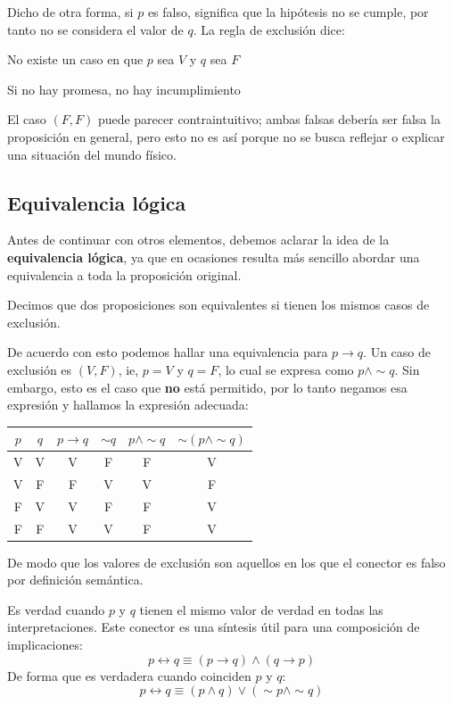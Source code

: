 \documentclass{book}
\begin{document}
  Dicho de otra forma, si $p$ es falso, significa que la hipótesis no se cumple,
  por tanto no se considera el valor de $q$. La regla de exclusión dice:
  
  \alert{No existe un caso en que $p$ sea $V$ y $q$ sea $F$}
  
  \alert{Si no hay promesa, no hay incumplimiento}
  
  El caso $(F, F)$ puede parecer contraintuitivo; ambas falsas debería ser falsa la proposición
  en general, pero esto no es así porque no se busca reflejar o explicar una situación del mundo físico.
  
  \subsection{Equivalencia lógica}
  
  Antes de continuar con otros elementos, debemos aclarar la idea de la \textbf{equivalencia
  lógica}, ya que en ocasiones resulta más sencillo abordar una equivalencia a toda la
  proposición original.
  
  \begin{definition}[title=Equivalencia]
  Decimos que dos proposiciones son equivalentes si tienen los mismos casos de exclusión.
  \end{definition}
  
  De acuerdo con esto podemos hallar una equivalencia para $p \to q$. Un caso de exclusión
  es $(V, F)$, ie, $p = V$ y $q = F$, lo cual se expresa como $p \land \sim q$. Sin embargo,
  esto es el caso que \textbf{no} está permitido, por lo tanto negamos esa expresión y
  hallamos la expresión adecuada:
  
  \begin{tabular}{c|c|c|c|c|c}
  $p$ & $q$ & $p \to q$ & $\sim q$ & $p \land \sim q$ & $\sim(p \land \sim q)$ \\
  \hline
  V & V & V & F & F & V \\
  V & F & F & V & V & F \\
  F & V & V & F & F & V \\
  F & F & V & V & F & V \\
  \end{tabular}
  
  \alert{De modo que los valores de exclusión son aquellos en los que el conector es falso
  por definición semántica.}
  
  \begin{definition}[title=Bicondicional]
  Es verdad cuando $p$ y $q$ tienen el mismo valor de verdad en todas las interpretaciones.
  Este conector es una síntesis útil para una composición de implicaciones:
  \begin{equation}
  p \leftrightarrow q \equiv (p \to q) \land (q \to p)
  \end{equation}
  De forma que es verdadera cuando coinciden $p$ y $q$:
  \begin{equation}
  p \leftrightarrow q \equiv (p \land q) \lor (\sim p \land \sim q)
  \end{equation}
  \end{definition}
  
\end{document}
